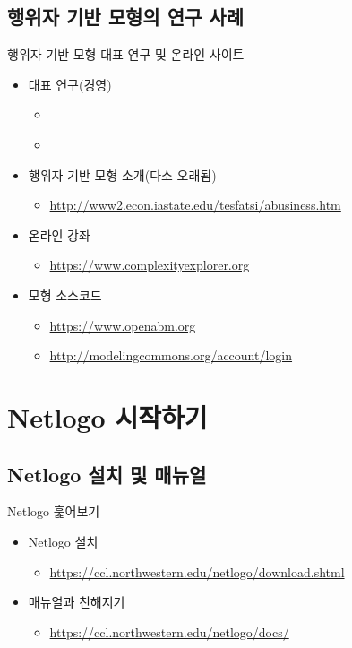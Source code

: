 \documentclass[hyperref={unicode}]{beamer}
\begin{document}
\subsection*{행위자 기반 모형의 연구 사례}
\begin{frame}{행위자 기반 모형 대표 연구 및 온라인 사이트}
\begin{itemize}
\item 대표 연구(경영)
	\begin{itemize}
	\item \cite{Bonabeau:2002aa}
	\item \cite{Rand:2011aa}
	\end{itemize}
\item 행위자 기반 모형 소개(다소 오래됨)
	\begin{itemize}
	\item \url{http://www2.econ.iastate.edu/tesfatsi/abusiness.htm}
	\end{itemize}
\item 온라인 강좌
	\begin{itemize}
	\item \url{https://www.complexityexplorer.org}
	\end{itemize}
\item 모형 소스코드
	\begin{itemize}
	\item \url{https://www.openabm.org}
	\item \url{http://modelingcommons.org/account/login}
	\end{itemize}
\end{itemize}	
\end{frame}

\section{Netlogo 시작하기}
\subsection*{Netlogo 설치 및 매뉴얼}
\begin{frame}{Netlogo 훑어보기}
\begin{itemize}
\item Netlogo 설치
	\begin{itemize}
	\item \url{https://ccl.northwestern.edu/netlogo/download.shtml}
	\end{itemize}
\item 매뉴얼과 친해지기
	\begin{itemize}
	\item \url{https://ccl.northwestern.edu/netlogo/docs/}
	\end{itemize}
\end{itemize}
\end{frame}
\end{document}
